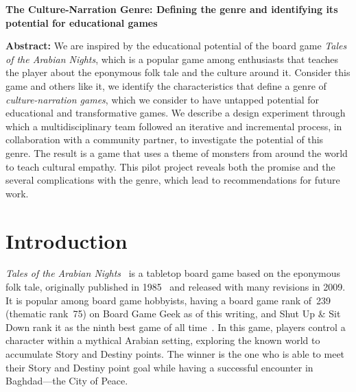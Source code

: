 \documentclass[a4paper]{article}
\newcommand{\projecttitle}{The Culture-Narration Genre: Defining the genre and identifying its potential for educational games}
\begin{document}
\begin{center}
\fontsize{14}{16.8}\selectfont
\bf \projecttitle
\end{center}

\vspace{-0.25in}
\begin{center}
\iftoggle{blind}{
}{
Paul Gestwicki, Kaley Rittichier, and Austin DeArmond, Ball State University\\
pvgestwicki@bsu.edu, kjrittichier@bsu.edu, ajdearmond@bsu.edu\\
}
\end{center}

\newcommand{\totan}{\textit{TotAN}}
\newcommand{\smersh}{\textit{SMERSH}}
\newcommand{\figwidth}{2.5in}

%
\begin{adjustwidth}{0.5in}{0.5in}
  \textbf{Abstract:} We are inspired by the educational potential of
  the board game \textit{Tales of the Arabian Nights}, which is a
  popular game among enthusiasts that teaches the player about the
  eponymous folk tale and the culture around it. Consider this game
  and others like it, we identify the characteristics that define a
  genre of \textit{culture-narration games}, which we consider to have
  untapped potential for educational and transformative games.
  We describe a design experiment through which a multidisciplinary team
  followed an iterative and incremental process, in collaboration
  with a community partner, to investigate the potential of this genre.
  The result is a game that uses a theme of monsters from around the
  world to teach cultural empathy.
  This pilot project reveals both the promise and the several complications
  with the genre, which lead to recommendations for future work.
\end{adjustwidth}

\section{Introduction}


\textit{Tales of the Arabian Nights}~\citep{Goldberg2009} is a 
tabletop board game based on the eponymous folk tale,
originally published in 1985~\citep{Goldberg1985} and
released with many revisions in 2009.
It is popular among board game hobbyists, having a board game
rank of~239 (thematic rank~75) on Board Game Geek as of this writing,
and Shut Up \& Sit Down rank it as the ninth best game of all 
time~\citep{ShutUp2015}.
In this game, players control a character within a mythical Arabian
setting, exploring the known world to accumulate Story and
Destiny points. The winner is the one who is able to meet their 
Story and Destiny point goal while having a successful encounter
in Baghdad---the City of Peace. 
\end{document}
